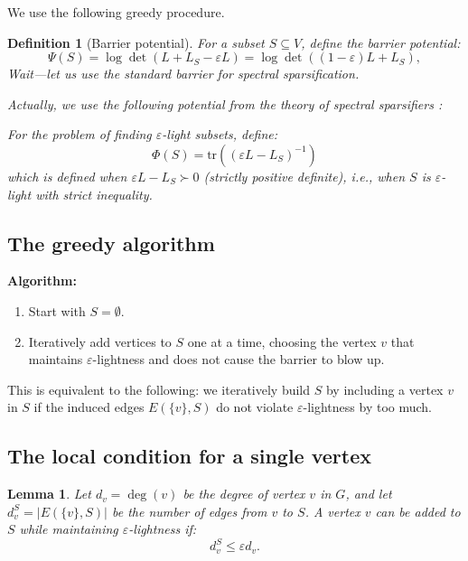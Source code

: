 \documentclass[12pt]{article}
\newtheorem{lemma}[theorem]{Lemma}
\newtheorem{definition}[theorem]{Definition}
\begin{document}
We use the following greedy procedure.

\begin{definition}[Barrier potential]
For a subset $S \subseteq V$, define the \emph{barrier potential}:
\[
\Psi(S) = \log \det(L + L_S - \varepsilon L) = \log \det((1-\varepsilon)L + L_S),
\]
Wait---let us use the standard barrier for spectral sparsification.

Actually, we use the following potential from the theory of spectral sparsifiers \cite{BSS2012}:

For the problem of finding $\varepsilon$-light subsets, define:
\[
\Phi(S) = \mathrm{tr}((\varepsilon L - L_S)^{-1})
\]
which is defined when $\varepsilon L - L_S \succ 0$ (strictly positive definite), i.e., when $S$ is $\varepsilon$-light with strict inequality.
\end{definition}

\subsection{The greedy algorithm}

\textbf{Algorithm:}
\begin{enumerate}
\item Start with $S = \emptyset$.
\item Iteratively add vertices to $S$ one at a time, choosing the vertex $v$ that maintains $\varepsilon$-lightness and does not cause the barrier to blow up.
\end{enumerate}

This is equivalent to the following: we iteratively build $S$ by including a vertex $v$ in $S$ if the induced edges $E(\{v\}, S)$ do not violate $\varepsilon$-lightness by too much.

\subsection{The local condition for a single vertex}

\begin{lemma}\label{lem:single-vertex}
Let $d_v = \deg(v)$ be the degree of vertex $v$ in $G$, and let $d_v^S = |E(\{v\}, S)|$ be the number of edges from $v$ to $S$. A vertex $v$ can be added to $S$ while maintaining $\varepsilon$-lightness if:
\[
d_v^S \leq \varepsilon d_v.
\]
\end{lemma}
\end{document}
